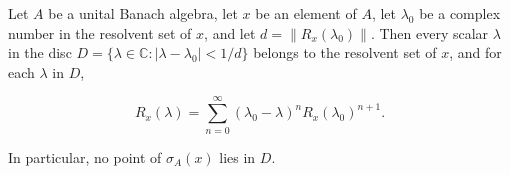 Let $A$ be a unital Banach algebra, let $x$ be an element of $A$, let $\lambda_0$ be a complex number in the resolvent set of $x$, and let $d = \| R_x(\lambda_0) \|$. Then every scalar $\lambda$ in the disc $D = \{\lambda \in \mathbb{C}: |\lambda - \lambda_0| < 1/d\}$ belongs to the resolvent set of $x$, and for each $\lambda$ in $D$,

$$R_x(\lambda) = \sum_{n=0}^{\infty} (\lambda_0 - \lambda)^n R_x(\lambda_0)^{n+1}. \tag{9}$$

In particular, no point of $\sigma_A(x)$ lies in $D$.
